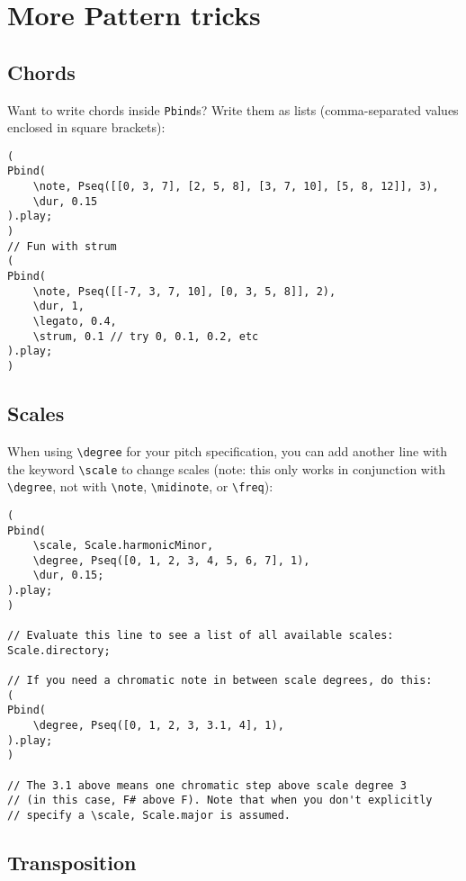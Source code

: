 \section{More Pattern tricks}

\subsection{Chords}

Want to write chords inside \texttt{Pbind}s? Write them as lists (comma-separated values enclosed in square brackets):
 
\begin{lstlisting}[style=SuperCollider-IDE, basicstyle=\scttfamily\footnotesize]
(
Pbind(
	\note, Pseq([[0, 3, 7], [2, 5, 8], [3, 7, 10], [5, 8, 12]], 3),
	\dur, 0.15
).play;
)
// Fun with strum
(
Pbind(
	\note, Pseq([[-7, 3, 7, 10], [0, 3, 5, 8]], 2),
	\dur, 1,
	\legato, 0.4,
	\strum, 0.1 // try 0, 0.1, 0.2, etc
).play;
)
\end{lstlisting}
 

\subsection{Scales}

When using \texttt{\textbackslash degree} for your pitch specification, you can add another line with the keyword \texttt{\textbackslash scale} to change scales (note: this only works in conjunction with \texttt{\textbackslash degree}, not with \texttt{\textbackslash note}, \texttt{\textbackslash midinote}, or \texttt{\textbackslash freq}):

 
\begin{lstlisting}[style=SuperCollider-IDE, basicstyle=\scttfamily\footnotesize]
(
Pbind(
	\scale, Scale.harmonicMinor,
	\degree, Pseq([0, 1, 2, 3, 4, 5, 6, 7], 1),
	\dur, 0.15;
).play;
)

// Evaluate this line to see a list of all available scales:
Scale.directory;

// If you need a chromatic note in between scale degrees, do this:
(
Pbind(
	\degree, Pseq([0, 1, 2, 3, 3.1, 4], 1),
).play;
)

// The 3.1 above means one chromatic step above scale degree 3
// (in this case, F# above F). Note that when you don't explicitly
// specify a \scale, Scale.major is assumed.
\end{lstlisting}

\subsection{Transposition}

